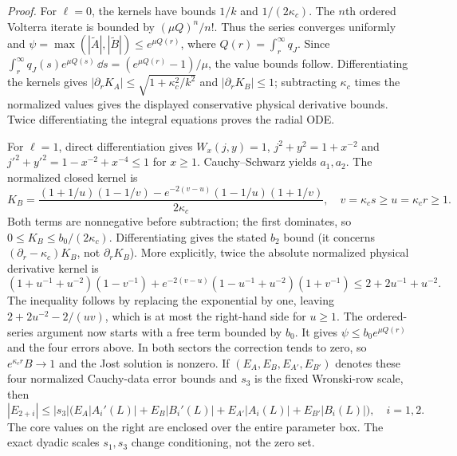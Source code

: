 \noindent\emph{Proof.}
For $\ell=0$, the kernels have bounds $1/k$ and $1/(2\kappa_c)$.
The $n$th ordered Volterra iterate is bounded by $(\mu Q)^n/n!$.
Thus the series converges uniformly and
$\psi=\max(|\widetilde A|,|\widetilde B|)\leq e^{\mu Q(r)}$,
where $Q(r)=\int_r^\infty q_J$. Since
$\int_r^\infty q_J(s)e^{\mu Q(s)}\,\dd s=(e^{\mu Q(r)}-1)/\mu$,
the value bounds follow. Differentiating the kernels gives
$|\partial_rK_A|\leq\sqrt{1+\kappa_c^2/k^2}$ and
$|\partial_rK_B|\leq1$; subtracting $\kappa_c$ times the normalized
values gives the displayed conservative physical derivative bounds.
Twice differentiating the integral equations proves the radial ODE.

For $\ell=1$, direct differentiation gives
$W_x(j,y)=1$, $j^2+y^2=1+x^{-2}$ and
$j'^2+y'^2=1-x^{-2}+x^{-4}\leq1$ for $x\geq1$.
Cauchy--Schwarz yields $a_1,a_2$. The normalized closed kernel is
\begin{equation}
 K_B=\frac{(1+1/u)(1-1/v)-e^{-2(v-u)}(1-1/u)(1+1/v)}{2\kappa_c},
 \quad v=\kappa_cs\geq u=\kappa_cr\geq1.
\end{equation}
Both terms are nonnegative before subtraction; the first dominates,
so $0\leq K_B\leq b_0/(2\kappa_c)$. Differentiating gives the stated
$b_2$ bound (it concerns $(\partial_r-\kappa_c)K_B$, not
$\partial_rK_B$). More explicitly, twice the absolute normalized physical
derivative kernel is
\begin{equation}
 (1+u^{-1}+u^{-2})(1-v^{-1})
 +e^{-2(v-u)}(1-u^{-1}+u^{-2})(1+v^{-1})
 \leq 2+2u^{-1}+u^{-2}.
\end{equation}
The inequality follows by replacing the exponential by one, leaving
$2+2u^{-2}-2/(uv)$, which is at most the right-hand side for $u\geq1$.
The ordered-series argument now starts with a free term bounded by $b_0$.
It gives $\psi\leq b_0e^{\mu Q(r)}$ and the four errors above.
In both sectors the correction tends to zero, so
$e^{\kappa_cr}B\to1$ and the Jost solution is nonzero.
If $(E_A,E_B,E_{A'},E_{B'})$ denotes these four normalized Cauchy-data
error bounds and $s_3$ is the fixed Wronski-row scale, then
\begin{equation}
 |E_{2+i}|\leq |s_3|\bigl(E_A|A_i'(L)|+E_B|B_i'(L)|
                    +E_{A'}|A_i(L)|+E_{B'}|B_i(L)|\bigr),\quad i=1,2.
\end{equation}
The core values on the right are enclosed over the entire parameter box.
The exact dyadic scales $s_1,s_3$ change conditioning, not the zero set.

